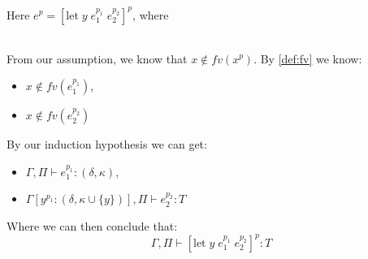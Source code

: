 \item[\runa{T-Let-1}] Here $e^p=[\mbox{let}\; y \; e_1^{p_1} \; e_2^{p_2}]^p$, where
\begin{figure}[H]
	\setlength\tabcolsep{8pt}
	\begin{tabular}{l}
		
	\end{tabular}
\end{figure}
From our assumption, we know that $x\notin fv(x^p)$.
By \cref{def:fv} we know:
\begin{itemize}
	\item $x\notin fv(e_1^{p_1})$,
	\item $x\notin fv(e_2^{p_2})$
\end{itemize}
By our induction hypothesis we can get:
\begin{itemize}
	\item $\Gamma,\Pi\vdash e_1^{p_1}:(\delta,\kappa)$,
	\item $\Gamma[y^{p_1}:(\delta,\kappa\cup \{y\})],\Pi\vdash e_2^{p_2}:T$
\end{itemize}
Where we can then conclude that:
$$\Gamma,\Pi\vdash [\mbox{let}\; y \; e_1^{p_1} \; e_2^{p_2}]^{p}:T$$
